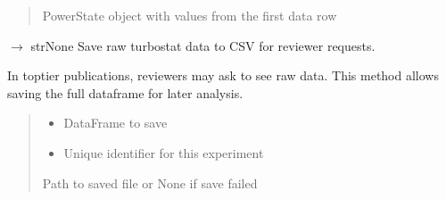 \documentclass[letterpaper,10pt,english]{sphinxmanual}
\begin{document}
\begin{fulllineitems}
\begin{fulllineitems}
\begin{quote}
\begin{description}
\sphinxAtStartPar
PowerState object with values from the first data row

\end{description}\end{quote}

\end{fulllineitems}


\begin{fulllineitems}
\label{\detokenize{core.readers.turbostat_reader:core.readers.turbostat_reader.TurbostatReader.save_raw_data}}
\pysigstartsignatures
\pysiglinewithargsret
{}
{\sphinxparamcomma {}}
{{ $\rightarrow$ strNone}}
\pysigstopsignatures
\sphinxAtStartPar
Save raw turbostat data to CSV for reviewer requests.

\sphinxAtStartPar
In top\sphinxhyphen{}tier publications, reviewers may ask to see raw data.
This method allows saving the full dataframe for later analysis.
\begin{quote}\begin{description}
\begin{itemize}
\item {} 
\sphinxAtStartPar
{} \textendash{} DataFrame to save

\item {} 
\sphinxAtStartPar
{} \textendash{} Unique identifier for this experiment

\end{itemize}

\sphinxAtStartPar
Path to saved file or None if save failed

\end{description}\end{quote}

\end{fulllineitems}



\end{fulllineitems}
\end{document}
